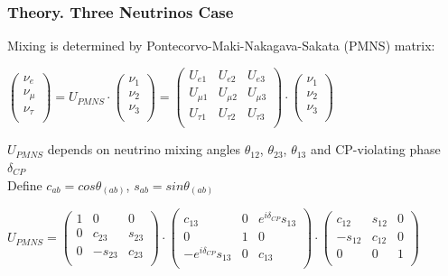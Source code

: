 \begin{frame}\frametitle{Theory. Three Neutrinos Case}
  \scriptsize
  Mixing is determined by Pontecorvo-Maki-Nakagava-Sakata (PMNS) matrix:\\
  \begin{center}
  $ \begin{pmatrix} \nu_{e} \\ \nu_{\mu} \\ \nu_{\tau} \\ \end{pmatrix}
  = U_{PMNS}\cdot \begin{pmatrix} \nu_{1} \\ \nu_{2} \\ \nu_{3} \\ \end{pmatrix} = 
  \begin{pmatrix}
  U_{e1} & U_{e2} & U_{e3} \\
  U_{\mu1} & U_{\mu2} & U_{\mu3} \\
  U_{\tau1} & U_{\tau2} & U_{\tau3} \\
  \end{pmatrix}
  \cdot
  \begin{pmatrix} \nu_{1} \\ \nu_{2} \\ \nu_{3} \\ \end{pmatrix}$\\
  \end{center}
  $U_{PMNS}$ depends on neutrino mixing angles $\theta_{12}$, $\theta_{23}$, $\theta_{13}$ and CP-violating phase $\delta_{CP}$\\
  Define $c_{ab}=cos\theta_(ab)$, $s_{ab}=sin\theta_(ab)$\\
  \begin{center}
  $U_{PMNS} =
  \begin{pmatrix}
  1 & 0 & 0 \\
  0 & c_{23} & s_{23} \\
  0 & -s_{23} & c_{23} \\
  \end{pmatrix}
  \cdot
  \begin{pmatrix}
  c_{13} & 0 & e^{i\delta_{CP}}s_{13} \\
  0 & 1 & 0 \\
  -e^{i\delta_{CP}}s_{13} & 0 & c_{13} \\
  \end{pmatrix}
  \cdot
  \begin{pmatrix}
  c_{12} & s_{12} & 0 \\
  -s_{12} & c_{12} & 0 \\
  0 & 0 & 1 \\
  \end{pmatrix}$ \\
  \end{center}
\end{frame} 

